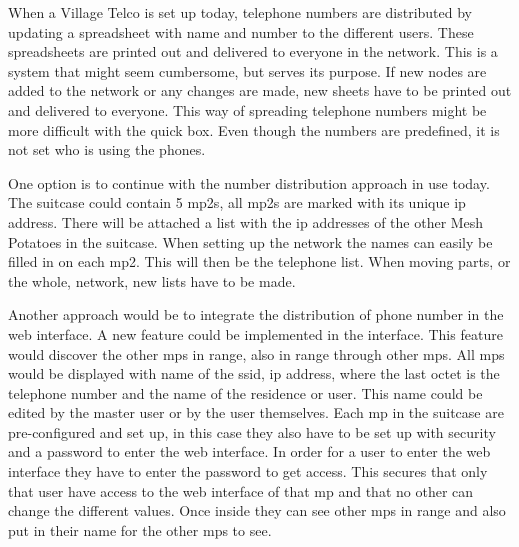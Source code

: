 When a Village Telco is set up today, telephone numbers are distributed by updating a spreadsheet with name and number to the different users. These spreadsheets are printed out and delivered to everyone in the network. This is a system that might seem cumbersome, but serves its purpose. If new nodes are added to the network or any changes are made, new sheets have to be printed out and delivered to everyone. This way of spreading telephone numbers might be more difficult with the \gls{quick} box. Even though the numbers are predefined, it is not set who is using the phones.  

One option is to continue with the number distribution approach in use today. The suitcase could contain 5 \glspl{mp2}, all \glspl{mp2} are marked with its unique \gls{ip} address. There will be attached a list with the \gls{ip} addresses of the other Mesh Potatoes in the suitcase. When setting up the network the names can easily be filled in on each \gls{mp2}. This will then be the telephone list. When moving parts, or the whole, network, new lists have to be made. 

Another approach would be to integrate the distribution of phone number in the web interface. A new feature could be implemented in the interface. This feature would discover the other \glspl{mp} in range, also in range through other \glspl{mp}. All \glspl{mp} would be displayed with name of the \gls{ssid}, \gls{ip} address, where the last octet is the telephone number and the name of the residence or user. This name could be edited by the master user or by the user themselves. Each \gls{mp} in the suitcase are pre-configured and set up, in this case they also have to be set up with security and a password to enter the web interface. In order for a user to enter the web interface they have to enter the password to get access. This secures that only that user have access to the web interface of that \gls{mp} and that no other can change the different values. Once inside they can see other \glspl{mp} in range and also put in their name for the other \glspl{mp} to see. 



